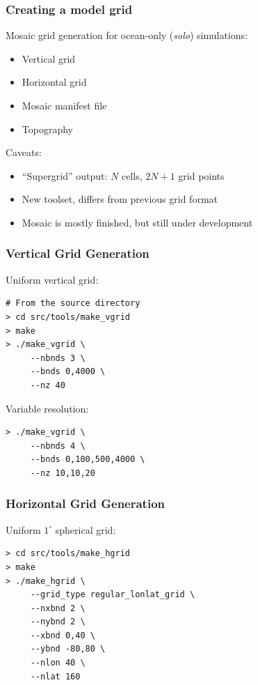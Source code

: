 \documentclass{beamer}
\begin{document}
\begin{frame}
    \frametitle{Creating a model grid}
    
    Mosaic grid generation for ocean-only (\textit{solo}) simulations:
    \begin{itemize}
        \item Vertical grid
        \item Horizontal grid
        \item Mosaic manifest file
        \item Topography
    \end{itemize}
    
    Caveats:
    \begin{itemize}
        \item ``Supergrid'' output: $N$ cells, $2N+1$ grid points
        \item New toolset, differs from previous grid format
        \item Mosaic is mostly finished, but still under development
    \end{itemize}
\end{frame}

\begin{frame}[fragile]
    \frametitle{Vertical Grid Generation}
    
    Uniform vertical grid:
    \begin{lstlisting}
# From the source directory
> cd src/tools/make_vgrid
> make
> ./make_vgrid \
     --nbnds 3 \
     --bnds 0,4000 \
     --nz 40
    \end{lstlisting}
    
    Variable resolution:
    \begin{lstlisting}
> ./make_vgrid \
     --nbnds 4 \
     --bnds 0,100,500,4000 \
     --nz 10,10,20
    \end{lstlisting}
\end{frame}

\begin{frame}[fragile]
    \frametitle{Horizontal Grid Generation}
   
    Uniform $1^\circ$ spherical grid:
    \begin{lstlisting}
> cd src/tools/make_hgrid
> make
> ./make_hgrid \
     --grid_type regular_lonlat_grid \
     --nxbnd 2 \
     --nybnd 2 \
     --xbnd 0,40 \
     --ybnd -80,80 \
     --nlon 40 \
     --nlat 160
    \end{lstlisting}
\end{frame}
\end{document}
